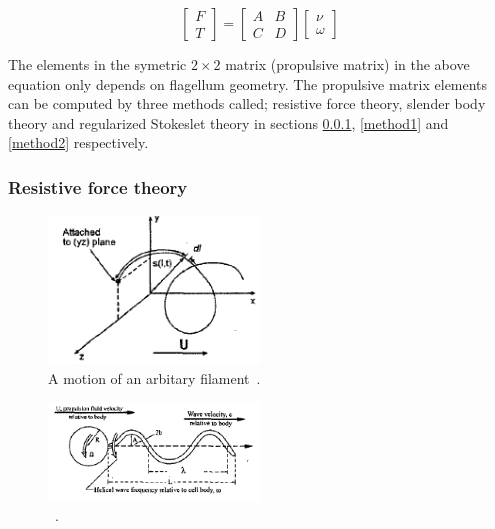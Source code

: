 \documentclass[12pt,a4paper,titlepage]{report}
\begin{document}
\[
\begin{bmatrix} F\\ 
T\end{bmatrix}  = \begin{bmatrix} A & B \\ 
C & D \end{bmatrix}  \begin{bmatrix} \nu
 \\ \omega
\end{bmatrix}
\]

The elements in the symetric $2\times2$ matrix (propulsive matrix) in the above equation only depends on 
flagellum geometry. The propulsive matrix elements can be computed by three methods called;
resistive force theory, slender body theory and regularized Stokeslet theory in sections \ref{method3}, 
\ref{method1} and \ref{method2} respectively. 





\subsubsection{Resistive force theory}\label{method3}


\begin{figure}
  \begin{center}
    \includegraphics[width=0.5\textwidth]{filament}
  \caption{A motion of an arbitary filament~\citep{edd2003biomimetic}.}
  \label{filament}
\end{center}
\end{figure}


\begin{figure}
  \begin{center}
    \includegraphics[width=0.5\textwidth]{motion}
  \caption{~\citep{edd2003biomimetic}.}
  \label{motion}
\end{center}
\end{figure}
\end{document}
